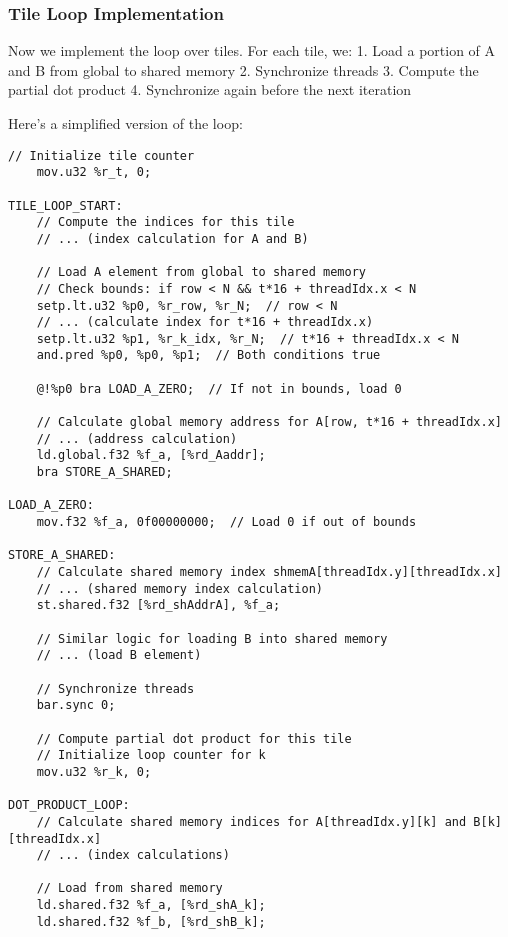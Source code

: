 \subsubsection{Tile Loop Implementation}

Now we implement the loop over tiles. For each tile, we:
1. Load a portion of A and B from global to shared memory
2. Synchronize threads
3. Compute the partial dot product
4. Synchronize again before the next iteration

Here's a simplified version of the loop:

\begin{lstlisting}[style=ptx]
    // Initialize tile counter
    mov.u32 %r_t, 0;
    
TILE_LOOP_START:
    // Compute the indices for this tile
    // ... (index calculation for A and B)
    
    // Load A element from global to shared memory
    // Check bounds: if row < N && t*16 + threadIdx.x < N
    setp.lt.u32 %p0, %r_row, %r_N;  // row < N
    // ... (calculate index for t*16 + threadIdx.x)
    setp.lt.u32 %p1, %r_k_idx, %r_N;  // t*16 + threadIdx.x < N
    and.pred %p0, %p0, %p1;  // Both conditions true
    
    @!%p0 bra LOAD_A_ZERO;  // If not in bounds, load 0
    
    // Calculate global memory address for A[row, t*16 + threadIdx.x]
    // ... (address calculation)
    ld.global.f32 %f_a, [%rd_Aaddr];
    bra STORE_A_SHARED;
    
LOAD_A_ZERO:
    mov.f32 %f_a, 0f00000000;  // Load 0 if out of bounds
    
STORE_A_SHARED:
    // Calculate shared memory index shmemA[threadIdx.y][threadIdx.x]
    // ... (shared memory index calculation)
    st.shared.f32 [%rd_shAddrA], %f_a;
    
    // Similar logic for loading B into shared memory
    // ... (load B element)
    
    // Synchronize threads
    bar.sync 0;
    
    // Compute partial dot product for this tile
    // Initialize loop counter for k
    mov.u32 %r_k, 0;
    
DOT_PRODUCT_LOOP:
    // Calculate shared memory indices for A[threadIdx.y][k] and B[k][threadIdx.x]
    // ... (index calculations)
    
    // Load from shared memory
    ld.shared.f32 %f_a, [%rd_shA_k];
    ld.shared.f32 %f_b, [%rd_shB_k];
    

\end{lstlisting}
